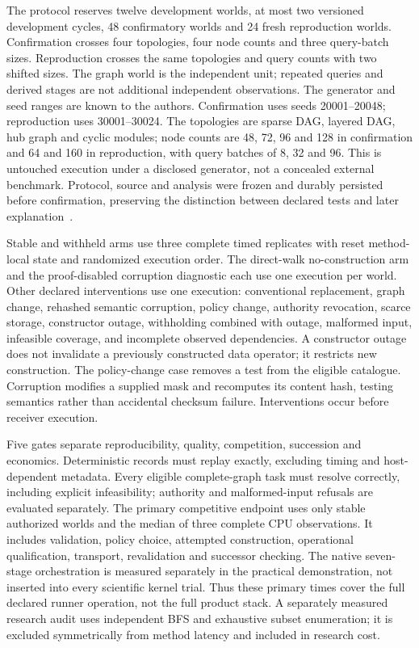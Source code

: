 The protocol reserves twelve development worlds, at most two versioned development cycles, 48 confirmatory worlds and 24 fresh reproduction worlds. Confirmation crosses four topologies, four node counts and three query-batch sizes. Reproduction crosses the same topologies and query counts with two shifted sizes. The graph world is the independent unit; repeated queries and derived stages are not additional independent observations. The generator and seed ranges are known to the authors. Confirmation uses seeds 20001--20048; reproduction uses 30001--30024. The topologies are sparse DAG, layered DAG, hub graph and cyclic modules; node counts are 48, 72, 96 and 128 in confirmation and 64 and 160 in reproduction, with query batches of 8, 32 and 96. This is untouched execution under a disclosed generator, not a concealed external benchmark. Protocol, source and analysis were frozen and durably persisted before confirmation, preserving the distinction between declared tests and later explanation~\cite{nosek2018preregistration}.

Stable and withheld arms use three complete timed replicates with reset method-local state and randomized execution order. The direct-walk no-construction arm and the proof-disabled corruption diagnostic each use one execution per world. Other declared interventions use one execution: conventional replacement, graph change, rehashed semantic corruption, policy change, authority revocation, scarce storage, constructor outage, withholding combined with outage, malformed input, infeasible coverage, and incomplete observed dependencies. A constructor outage does not invalidate a previously constructed data operator; it restricts new construction. The policy-change case removes a test from the eligible catalogue. Corruption modifies a supplied mask and recomputes its content hash, testing semantics rather than accidental checksum failure. Interventions occur before receiver execution.

Five gates separate reproducibility, quality, competition, succession and economics. Deterministic records must replay exactly, excluding timing and host-dependent metadata. Every eligible complete-graph task must resolve correctly, including explicit infeasibility; authority and malformed-input refusals are evaluated separately. The primary competitive endpoint uses only stable authorized worlds and the median of three complete CPU observations. It includes validation, policy choice, attempted construction, operational qualification, transport, revalidation and successor checking. The native seven-stage orchestration is measured separately in the practical demonstration, not inserted into every scientific kernel trial. Thus these primary times cover the full declared runner operation, not the full product stack. A separately measured research audit uses independent BFS and exhaustive subset enumeration; it is excluded symmetrically from method latency and included in research cost.

